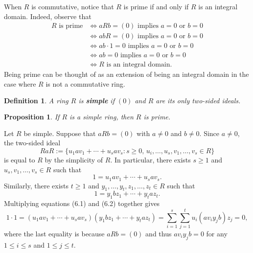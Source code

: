 \documentclass[10pt]{article}
\makeatletter
\numberwithin{equation}{section}
\theoremstyle{newstyle}
\newtheorem{prop}[thm]{Proposition}
\newtheorem{defn}[thm]{Definition}
\newenvironment{pf}[1][\proofname]{\par
  \pushQED{\qed}%
  \normalfont \topsep0\p@\relax
  \trivlist
  \item[\hskip\labelsep\scshape
  #1\@addpunct{.}]\ignorespaces
}{%
  \popQED\endtrivlist\@endpefalse
}
\makeatother
\begin{document}
When $R$ is commutative, notice that $R$ is prime if and only if $R$ is an integral domain. 
Indeed, observe that 
\begin{align*}
    R \text{ is prime} &\iff aRb = (0) \text{ implies } a = 0 \text{ or } b = 0 \\
    &\iff abR = (0) \text{ implies } a = 0 \text{ or } b = 0 \\
    &\iff ab \cdot 1 = 0 \text{ implies } a = 0 \text{ or } b = 0 \\
    &\iff ab = 0 \text{ implies } a = 0 \text{ or } b = 0 \\
    &\iff R \text{ is an integral domain.}
\end{align*}
Being prime can be thought of as an extension of being an integral domain in the case where $R$ 
is not a commutative ring. 

\begin{defn}
A ring $R$ is {\bf simple} if $(0)$ and $R$ are its only two-sided ideals.
\end{defn}

\begin{prop}
If $R$ is a simple ring, then $R$ is prime. 
\end{prop}
\begin{pf}
Let $R$ be simple. Suppose that $aRb = (0)$ with $a \neq 0$ and $b \neq 0$. Since $a \neq 0$, the 
two-sided ideal 
\[ RaR := \{u_1av_1 + \cdots + u_sav_s : s \geq 0,\, u_i, \dots, u_s, v_1, \dots, v_s \in R\} \]
is equal to $R$ by the simplicity of $R$. In particular, there exists $s \geq 1$ and 
$u_s, v_1, \dots, v_s \in R$ such that 
\begin{equation}
    1 = u_1av_1 + \cdots + u_sav_s. 
\end{equation}
Similarly, there exists $t \geq 1$ and $y_1, \dots, y_t, z_1, \dots, z_t \in R$ such that 
\begin{equation}
    1 = y_1bz_1 + \cdots + y_taz_t. 
\end{equation}
Multiplying equations (6.1) and (6.2) together gives 
\[ 1 \cdot 1 = (u_1av_1 + \cdots + u_sav_s)(y_1bz_1 + \cdots + y_taz_t) 
= \sum_{i=1}^s \sum_{j=1}^t u_i(av_iy_jb)z_j = 0, \]
where the last equality is because $aRb = (0)$ and thus $av_iy_jb = 0$ for any $1 \leq i \leq s$ 
and $1 \leq j \leq t$. 
\end{pf}
\end{document}
